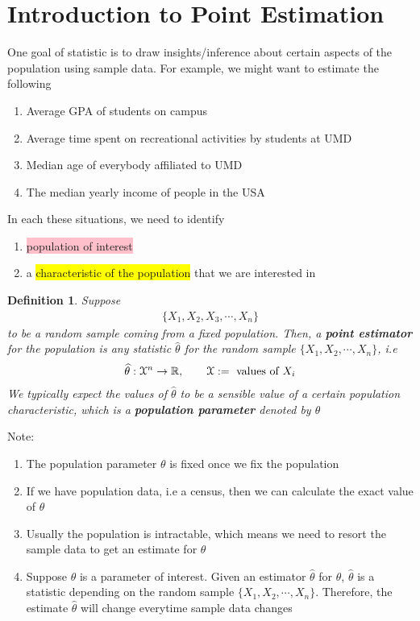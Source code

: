 \documentclass[11pt,oneside]{book}
\theoremstyle{newStyle}
\newtheorem{defn}[thm]{Definition}
\newcommand{\R}{\mathbb{R}}
\newcommand{\X}{\mathcal{X}}
\newcommand{\note}{\color{red}Note: \color{black}}
\begin{document}
\section[Introduction to Point Estimation]{Introduction to Point Estimation}
One goal of statistic is to draw insights/inference about certain aspects of the population using sample data. For example, we might want to estimate the following \begin{enumerate}
\item Average GPA of students on campus
\item Average time spent on recreational activities by students at UMD
\item Median age of everybody affiliated to UMD
\item The median yearly income of people in the USA
\end{enumerate}
In each these situations, we need to identify\begin{enumerate}
\item \colorbox{pink}{population of interest}
\item a \colorbox{yellow}{characteristic of the population} that we are interested in
\end{enumerate}
\begin{defn}
Suppose \begin{align*}
\{X_1,X_2,X_3,\cdots,X_n\}
\end{align*}
to be a random sample coming from a fixed population. Then, a \textbf{point estimator} for the population is any statistic $\widehat{\theta}$ for the random sample $\{X_1,X_2,\cdots,X_n\}$, i.e \begin{align*}
\widehat{\theta}:\X^n\to \R,\text{\qquad}\X:=\text{ values of }X_i
\end{align*}
We typically expect the values of $\widehat{\theta}$ to be a sensible value of a certain population characteristic, which is a \textbf{population parameter} denoted by $\theta$
\end{defn}
\note \begin{enumerate}
\item The population parameter $\theta$ is fixed once we fix the population
\item If we have population data, i.e a census, then we can calculate the exact value of $\theta$
\item Usually the population is intractable, which means we need to resort the sample data to get an estimate for $\theta$
\item Suppose $\theta$ is a parameter of interest. Given an estimator $\widehat{\theta}$ for $\theta$, $\widehat{\theta}$ is a statistic depending on the random sample $\{X_1,X_2,\cdots,X_n\}$. Therefore, the estimate $\widehat{\theta}$ will change everytime sample data changes
\end{enumerate}
\end{document}
